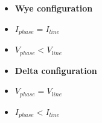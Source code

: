 \begin{itemize}
\goodbreak
\item{} {\bf Wye configuration} 
\item{} $I_{phase} = I_{line}$
\item{} $V_{phase} < V_{line}$ 
\end{itemize}

\begin{itemize}
\goodbreak
\item{} {\bf Delta configuration} 
\item{} $V_{phase} = V_{line}$ 
\item{} $I_{phase} < I_{line}$
\end{itemize}











